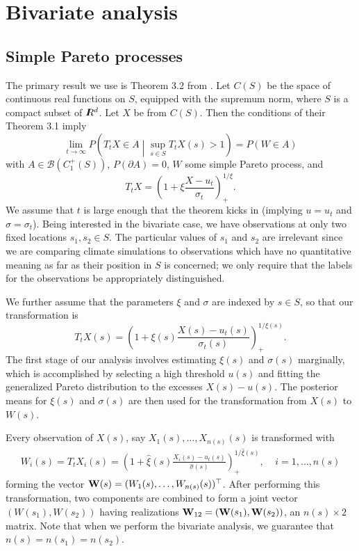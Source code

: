 \section{Bivariate analysis}

\subsection{Simple Pareto processes}

The primary result we use is Theorem 3.2 from \cite{ferreira2014generalized}. Let $C(S)$ be the space of continuous real functions on $S$, equipped with the supremum norm, where $S$ is a compact subset of $I\hspace{-4.4pt}R^d$. Let $X$ be from $C(S)$. Then the conditions of their Theorem 3.1 imply
\[ \lim_{t\rightarrow\infty} P\left(T_t X \in A \middle| \sup_{s\in S} T_t X(s) > 1\right) = P(W \in A) \]
with $A \in \mathcal{B}(C_1^+(S))$, $P(\partial A)=0$, $W$ some simple Pareto process, and
\[ T_t X = \left(1 + \xi \frac{X - u_t}{\sigma_t}\right)_+^{1/\xi}. \]
We assume that $t$ is large enough that the theorem kicks in (implying $u=u_t$ and $\sigma=\sigma_t$). Being interested in the bivariate case, we have observations at only two fixed locations $s_1,s_2\in S$. The particular values of $s_1$ and $s_2$ are irrelevant since we are comparing climate simulations to observations which have no quantitative meaning as far as their position in $S$ is concerned; we only require that the labels for the observations be appropriately distinguished.

We further assume that the parameters $\xi$ and $\sigma$ are indexed by $s\in S$, so that our transformation is
\[ T_t X(s) = \left(1 + \xi(s) \frac{X(s) - u_t(s)}{\sigma_t(s)}\right)_+^{1/\xi(s)}. \]
The first stage of our analysis involves estimating $\xi(s)$ and $\sigma(s)$ marginally, which is accomplished by selecting a high threshold $u(s)$ and fitting the generalized Pareto distribution to the excesses $X(s)-u(s)$. The posterior means for $\xi(s)$ and $\sigma(s)$ are then used for the transformation from $X(s)$ to $W(s)$.

Every observation of $X(s)$, say $X_1(s),\ldots,X_{n(s)}(s)$ is transformed with
\begin{align}
W_i(s) = T_t X_i(s) = \left(1 + \hat{\xi}(s) \frac{X_i(s) - u_t(s)}{\hat{\sigma}(s)}\right)_+^{1/\hat{\xi}(s)},~~~~~i=1,\ldots,n(s) \label{transform}
\end{align}
forming the vector $\mathbf{\bm{W}}(s)=(W_1(s),\ldots,W_{n(s)}(s))^\top$. After performing this transformation, two components are combined to form a joint vector $(W(s_1), W(s_2))$ having realizations $\mathbf{\bm{W}}_{12}=(\mathbf{\bm{W}}(s_1), \mathbf{\bm{W}}(s_2))$, an $n(s)\times 2$ matrix. Note that when we perform the bivariate analysis, we guarantee that $n(s)=n(s_1)=n(s_2)$.

